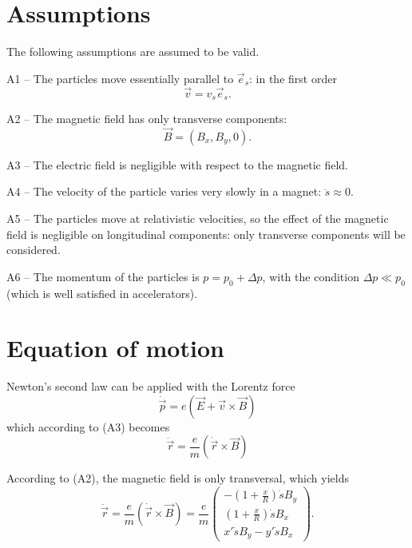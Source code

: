 \section{Assumptions}
The following assumptions are assumed to be valid.
\begin{description}
    \item{A1 --} The particles move essentially parallel to $\vec{e}_s$: in the first order
    \begin{equation*}
        \vec{v} = v_s \vec{e}_s.
    \end{equation*}
    \item{A2 --} The magnetic field has only transverse components:
        \begin{equation*}
        \vec{B} = (B_x, B_y, 0).
        \end{equation*}
    \item{A3 --} The electric field is negligible with respect to the magnetic field.
    \item{A4 --} The velocity of the particle varies very slowly in a magnet: $\ddot{s} \approx 0$.
    \item{A5 --} The particles move at relativistic velocities, so the effect of the magnetic field is negligible on longitudinal components: only transverse components will be considered.
    \item{A6 --} The momentum of the particles is $p = p_0+\Delta p$, with the condition $\Delta p \ll p_0$ (which is well satisfied in accelerators).
\end{description}

\section{Equation of motion}
\label{sec:eq_motion}
Newton's second law can be applied with the Lorentz force
\begin{equation}
\dot{\vec{p}} = e(\vec{E}+\vec{v} \times \vec{B})
\end{equation}
which according to (A3) becomes
\begin{equation}
\ddot{\vec{r}} = \frac{e}{m}(\dot{\vec{r}} \times \vec{B})
\end{equation}

According to (A2), the magnetic field is only transversal, which yields
\begin{equation}
\label{eq:lorentz_transv}
\ddot{\vec{r}} = \frac{e}{m}(\dot{\vec{r}} \times \vec{B})
= \frac{e}{m}
    \begin{pmatrix}
        -\left(1+\frac{x}{R}\right)\dot{s}B_y \\
        \left(1+\frac{x}{R}\right)\dot{s}B_x \\
        x'\dot{s}B_y - y'\dot{s}B_x
    \end{pmatrix}.
\end{equation}

